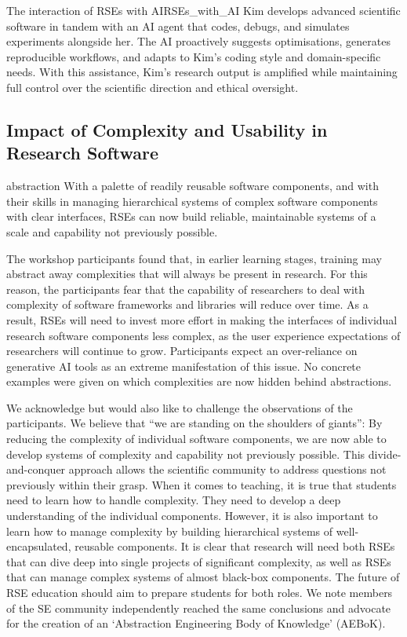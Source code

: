 \documentclass{eceasst}
\begin{document}
\begin{story}{The interaction of RSEs with AI}{RSEs_with_AI}
Kim develops advanced scientific software in tandem with an AI agent that codes,
debugs, and simulates experiments alongside her. The AI proactively suggests optimisations,
generates reproducible workflows, and adapts to Kim’s coding style and domain-specific needs.
With this assistance, Kim's research output is amplified while maintaining full control over the scientific direction and ethical oversight.
\end{story}

\subsection{Impact of Complexity and Usability in Research Software}
\label{sec:complexity}
\begin{whatis}{}{abstraction}
With a palette of readily reusable software components,
and with their skills in managing hierarchical systems of complex software components with clear interfaces,
RSEs can now build reliable, maintainable systems of a scale and capability not previously possible.
\end{whatis}

The workshop participants found that, in earlier learning stages,
training may abstract away complexities that will always be present in research.
For this reason, the participants fear that the capability of researchers to deal with complexity
of software frameworks and libraries will reduce over time.
As a result, RSEs will need to invest more effort in making the interfaces of individual research software components
less complex, as the user experience expectations of researchers will continue to grow.
Participants expect an over-reliance on generative AI tools as an extreme manifestation of this issue.
No concrete examples were given on which complexities are now hidden behind abstractions.

We acknowledge but would also like to challenge the observations of the participants.
We believe that ``we are standing on the shoulders of giants'':
By reducing the complexity of individual software components,
we are now able to develop systems of complexity and capability not previously possible.
This divide-and-conquer approach allows the scientific community to address questions not previously within their grasp.
When it comes to teaching, it is true that students need to learn how to handle complexity.
They need to develop a deep understanding of the individual components.
However, it is also important to learn how to manage complexity
by building hierarchical systems of well-encapsulated, reusable components.
It is clear that research will need both RSEs that can dive deep into single projects of significant complexity,
as well as RSEs that can manage complex systems of almost black-box components.
The future of RSE education should aim to prepare students for both roles.
We note members of the SE community independently reached the same conclusions
and advocate for the creation of an `Abstraction Engineering Body of Knowledge'
(AEBoK)\cite{Bencomo2024AEBoK}.
\end{document}
